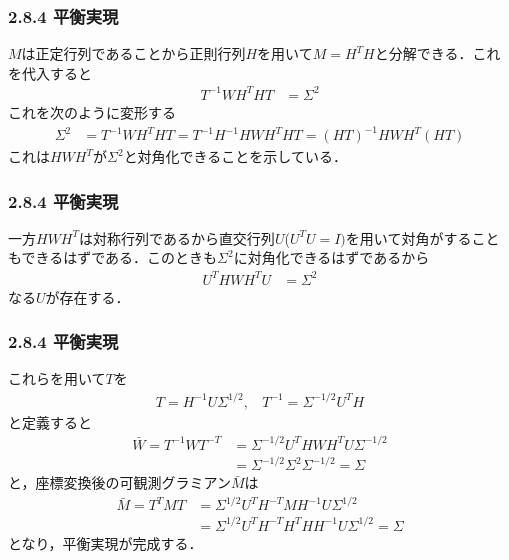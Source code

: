 \begin{frame}[t]
\frametitle{2.8.4 平衡実現}
$M$は正定行列であることから正則行列$H$を用いて$M=H^T H$と分解できる．これを代入すると
\begin{align}
	T^{-1} W H^T H T &= \Sigma^2
\end{align}
これを次のように変形する
\begin{align}
	\Sigma^2 &= T^{-1} W H^T H T 
		= T^{-1} H^{-1} H W H^T H T 
		= (HT)^{-1} HWH^T (HT)
\end{align}
これは$HWH^T$が$\Sigma^2$と対角化できることを示している．
\end{frame}

\begin{frame}[t]
\frametitle{2.8.4 平衡実現}
一方$HWH^T$は対称行列であるから直交行列$U$($U^TU=I)$を用いて対角がすることもできるはずである．このときも$\Sigma^2$に対角化できるはずであるから
\begin{align}
	U^T HWH^T U & = \Sigma^2
\end{align}
なる$U$が存在する．
\end{frame}

\begin{frame}[t]
\frametitle{2.8.4 平衡実現}
これらを用いて$T$を
\begin{align}
	T=H^{-1} U \Sigma^{1/2}
	, \ \ \ \
	T^{-1} = \Sigma^{-1/2} U^T H
\end{align}
と定義すると
\begin{align}
	\bar{W}= T^{-1} W T^{-T} 
	& =  \Sigma^{-1/2} U^T H W H^T U \Sigma^{-1/2} 
\nonumber \\
	& =  \Sigma^{-1/2} \Sigma^2 \Sigma^{-1/2} = \Sigma
\end{align}
と，座標変換後の可観測グラミアン$\bar{M}$は
\begin{align}
	\bar{M}= T^T M T 
	& = \Sigma^{1/2} U^T H^{-T}M H^{-1} U \Sigma^{1/2}
\nonumber \\
	& = \Sigma^{1/2} U^T H^{-T} H^T H H^{-1} U \Sigma^{1/2} = \Sigma
\end{align}
となり，平衡実現が完成する．
\end{frame}


